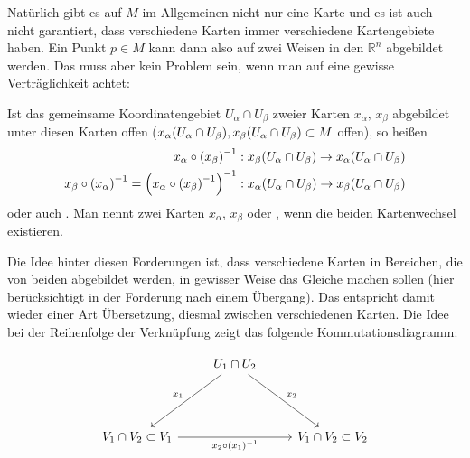 \documentclass[../H_Analysis_main.tex]{subfiles}
\begin{document}
Natürlich gibt es auf $M$ im Allgemeinen nicht nur eine Karte und es ist auch nicht garantiert, dass verschiedene Karten immer verschiedene Kartengebiete haben. Ein Punkt $p \in M$ kann dann also auf zwei Weisen in den $\mathbb{R}^n$ abgebildet werden. Das muss aber kein Problem sein, wenn man auf eine gewisse Verträglichkeit achtet:
\begin{defi}[Kartenwechsel]
Ist das gemeinsame Koordinatengebiet $U_ \alpha \cap U_\beta$ zweier Karten $x_\alpha, \, x_\beta$ abgebildet unter diesen Karten offen ($x_\alpha\qty(U_ \alpha \cap U_\beta), x_\beta\qty(U_ \alpha \cap U_\beta) \subset M$ offen), so heißen
\begin{equation}
\begin{split}
x_\alpha \circ \qty(x_\beta)^{-1}&: x_\beta\qty(U_ \alpha \cap U_\beta) \rightarrow x_\alpha\qty(U_ \alpha \cap U_\beta)
\\
x_\beta \circ \qty(x_\alpha)^{-1} = \qty(x_\alpha \circ \qty(x_\beta)^{-1})^{-1}&: x_\alpha\qty(U_ \alpha \cap U_\beta) \rightarrow x_\beta\qty(U_ \alpha \cap U_\beta)
\end{split}
\end{equation}
 oder auch . Man nennt zwei Karten $x_\alpha, \, x_\beta$  oder , wenn die beiden Kartenwechsel existieren.
\end{defi}

Die Idee hinter diesen Forderungen ist, dass verschiedene Karten in Bereichen, die von beiden abgebildet werden, in gewisser Weise das Gleiche machen sollen (hier berücksichtigt in der Forderung nach einem Übergang). Das entspricht damit wieder einer Art Übersetzung, diesmal zwischen verschiedenen Karten. Die Idee bei der Reihenfolge der Verknüpfung zeigt das folgende Kommutationsdiagramm:

$$
\begin{tikzcd}[row sep=42pt]
 & \ar{dl}[swap]{x_1} U_1 \cap U_2 \ar{dr}{x_2} & \\
V_1 \cap V_2 \subset V_1 \ar{rr}[swap]{x_2 \circ \qty(x_1)^{-1}} & & V_1 \cap V_2  \subset V_2 %
\end{tikzcd}
$$
\end{document}
